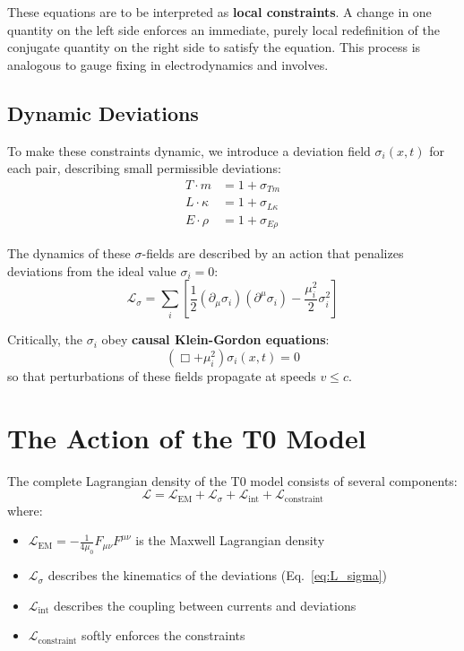 \documentclass[10pt, a4paper]{article}
\begin{document}
	These equations are to be interpreted as \textbf{local constraints}. A change in one quantity on the left side enforces an immediate, purely local redefinition of the conjugate quantity on the right side to satisfy the equation. This process is analogous to gauge fixing in electrodynamics and involves.
	
	\subsection{Dynamic Deviations}
	To make these constraints dynamic, we introduce a deviation field $\sigma_i(x,t)$ for each pair, describing small permissible deviations:
	\begin{align}
		T \cdot m &= 1 + \sigma_{Tm} \label{eq:sigma_tm} \\
		L \cdot \kappa &= 1 + \sigma_{L\kappa} \label{eq:sigma_lk} \\
		E \cdot \rho &= 1 + \sigma_{E\rho} \label{eq:sigma_er}
	\end{align}
	
	The dynamics of these $\sigma$-fields are described by an action that penalizes deviations from the ideal value $\sigma_i = 0$:
	\begin{equation}
		\mathcal{L}_{\sigma} = \sum_i \left[ \frac{1}{2} (\partial_\mu \sigma_i)(\partial^\mu \sigma_i) - \frac{\mu_i^2}{2} \sigma_i^2 \right] \label{eq:L_sigma}
	\end{equation}
	
	Critically, the $\sigma_i$ obey \textbf{causal Klein-Gordon equations}:
	\begin{equation}
		(\Box + \mu_i^2) \sigma_i(x,t) = 0 \label{eq:kg}
	\end{equation}
	so that perturbations of these fields propagate at speeds $v \leq c$.
	
	\section{The Action of the T0 Model}
	The complete Lagrangian density of the T0 model consists of several components:
	\begin{equation}
		\mathcal{L} = \mathcal{L}_{\text{EM}} + \mathcal{L}_{\sigma} + \mathcal{L}_{\text{int}} + \mathcal{L}_{\text{constraint}} \label{eq:full_L}
	\end{equation}
	where:
	\begin{itemize}
		\item $\mathcal{L}_{\text{EM}} = -\frac{1}{4\mu_0} F_{\mu\nu} F^{\mu\nu}$ is the Maxwell Lagrangian density
		\item $\mathcal{L}_{\sigma}$ describes the kinematics of the deviations (Eq.~\ref{eq:L_sigma})
		\item $\mathcal{L}_{\text{int}}$ describes the coupling between currents and deviations
		\item $\mathcal{L}_{\text{constraint}}$ softly enforces the constraints
	\end{itemize}
	
\end{document}
